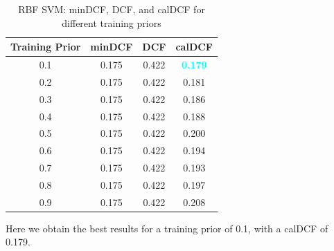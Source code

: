 \documentclass[12pt]{report}
\begin{document}
\begin{table}[H]
    \centering
    \begin{tabular}{|c|c|c|c|}
        \hline
        \rowcolor{blue!10}
        \textbf{Training Prior} & \textbf{minDCF} & \textbf{DCF} & \textbf{calDCF}                  \\
        \hline
        0.1                     & 0.175           & 0.422        & \textcolor{cyan}{\textbf{0.179}} \\
        \hline
        0.2                     & 0.175           & 0.422        & 0.181                            \\
        \hline
        0.3                     & 0.175           & 0.422        & 0.186                            \\
        \hline
        0.4                     & 0.175           & 0.422        & 0.188                            \\
        \hline
        0.5                     & 0.175           & 0.422        & 0.200                            \\
        \hline
        0.6                     & 0.175           & 0.422        & 0.194                            \\
        \hline
        0.7                     & 0.175           & 0.422        & 0.193                            \\
        \hline
        0.8                     & 0.175           & 0.422        & 0.197                            \\
        \hline
        0.9                     & 0.175           & 0.422        & 0.208                            \\
        \hline
    \end{tabular}
    \caption{RBF SVM: minDCF, DCF, and calDCF for different training priors}
    \label{tab:RBF_SVM_Priors}
\end{table}
\noindent
Here we obtain the best results for a training prior of 0.1, with a calDCF of 0.179.
\end{document}
